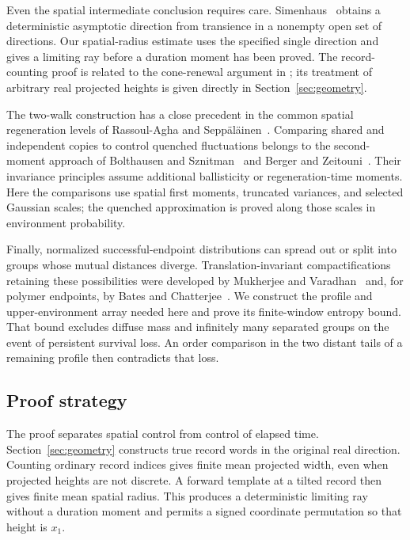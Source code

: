 Even the spatial intermediate conclusion requires care.
Simenhaus~\cite[Theorem~1]{Simenhaus2007} obtains a deterministic
asymptotic direction from transience in a nonempty open set of
directions. Our spatial-radius estimate uses the specified single
direction and gives a limiting ray before a duration moment has been
proved. The record-counting proof is related to the cone-renewal
argument in \cite[Lemma~2]{Simenhaus2007}; its treatment of arbitrary
real projected heights is given directly in Section~\ref{sec:geometry}.

The two-walk construction has a close precedent in the common spatial
regeneration levels of Rassoul-Agha and
Sepp\"al\"ainen~\cite[Section~7]{RassoulAghaSeppalainen2009}. Comparing
shared and independent copies to control quenched fluctuations belongs
to the second-moment approach of Bolthausen and
Sznitman~\cite{BolthausenSznitman2002} and Berger and
Zeitouni~\cite{BergerZeitouni2008}. Their invariance principles assume
additional ballisticity or regeneration-time moments. Here the
comparisons use spatial first moments, truncated variances, and selected
Gaussian scales; the quenched approximation is proved along those
scales in environment probability.

Finally, normalized successful-endpoint distributions can spread out or
split into groups whose mutual distances diverge. Translation-invariant
compactifications retaining these possibilities were developed by
Mukherjee and Varadhan~\cite{MukherjeeVaradhan2016} and, for polymer
endpoints, by Bates and Chatterjee~\cite{BatesChatterjee2020}. We construct
the profile and upper-environment array needed here and prove its
finite-window entropy bound. That bound excludes diffuse mass and
infinitely many separated groups on the event of persistent survival
loss. An order comparison in the two distant tails of a remaining
profile then contradicts that loss.

\subsection{Proof strategy}

The proof separates spatial control from control of elapsed time.
Section~\ref{sec:geometry} constructs true record words in the original
real direction. Counting ordinary record indices gives finite mean
projected width, even when projected heights are not discrete. A forward
template at a tilted record then gives finite mean spatial radius.
This produces a deterministic limiting ray without a duration moment and
permits a signed coordinate permutation so that height is $x_1$.

